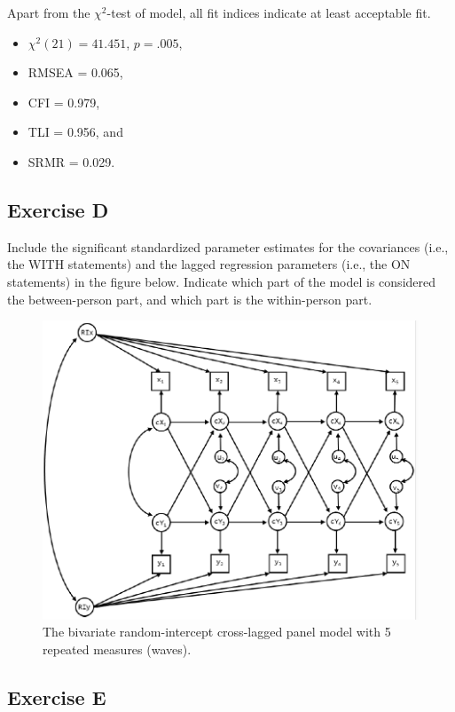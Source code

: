 \documentclass[
]{book}
\providecommand{\tightlist}{%
  \setlength{\itemsep}{0pt}\setlength{\parskip}{0pt}}
\begin{document}
Apart from the \(\chi^{2}\)-test of model, all fit indices indicate at least acceptable fit.

\begin{itemize}
\tightlist
\item
  \(\chi^{2} (21) = 41.451\), \(p = .005\),
\item
  RMSEA = 0.065,
\item
  CFI = 0.979,
\item
  TLI = 0.956, and
\item
  SRMR = 0.029.
\end{itemize}

\hypertarget{exercise-d-1}{%
\subsection{Exercise D}\label{exercise-d-1}}

Include the significant standardized parameter estimates for the covariances (i.e., the WITH statements) and the lagged regression parameters (i.e., the ON statements) in the figure below. Indicate which part of the model is considered the between-person part, and which part is the within-person part.

\begin{figure}
\centering
\includegraphics[width=5.20833in,height=\textheight]{figures/RICLPM-5waves.png}
\caption{The bivariate random-intercept cross-lagged panel model with 5 repeated measures (waves).}
\end{figure}

\hypertarget{exercise-e-1}{%
\subsection{Exercise E}\label{exercise-e-1}}
\end{document}
